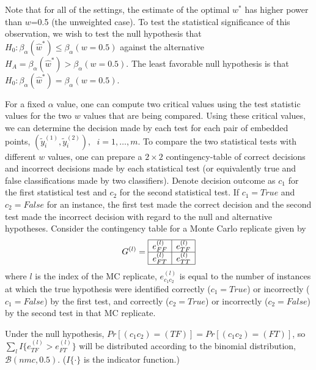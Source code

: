 \documentclass[11pt]{article} %
\begin{document}
Note that  for all of the settings, the estimate of the optimal $w^{*}$ has  higher power than $w$=0.5 (the unweighted case).
To test the statistical significance of this observation, we wish to test the null hypothesis that  $H_{0}: \beta_{\alpha}({\hat{w}^*})\leq\beta_{\alpha}({w=0.5})$ against the alternative $H_{A}=\beta_{\alpha}({\hat{w}^*})>\beta_{\alpha}({w=0.5})$.  The least favorable null hypothesis is that  $H_{0}: \beta_{\alpha}({\hat{w}^*})=\beta_{\alpha}({w=0.5})$.

For a fixed $\alpha$ value, one can compute two critical values  using the test statistic values for the two $w$ values that are being compared. Using these critical  values, we can  determine the decision made by each test for each pair of embedded points, $(\tilde{y}_i^{(1)},\tilde{y}_i^{(2)}),\hspace{7pt}i=1,\ldots,m$. To compare the  two statistical tests with different $w$ values, one can prepare a $2\times 2$ contingency-table of correct decisions and incorrect decisions made by each statistical test (or equivalently true and false classifications made by two classifiers). Denote decision outcome as $c_1$ for the first statistical test and $c_2$ for the second statistical test. If $c_1=True$ and $c_2=False$ for an instance,  the first test made the correct decision and the second test made the incorrect decision with regard to the null and alternative hypotheses.
Consider the contingency table for a Monte Carlo replicate given by $$G^{(l)}= \begin{array}{|c|c|}
      \hline
       e_{FF}^{(l)} & e_{TF}^{(l)}\\
      \hline
       e_{FT}^{(l)} & e_{TT}^{(l)}\\
      \hline
      \end{array}      $$  where $l$ is the index of the MC replicate, $e_{c_1c_2}^{(l)}$ is equal to the number of instances at which the true hypothesis were identified  correctly ($c_1=True$) or incorrectly ($c_1=False$) by the first test, and correctly ($c_2=True$) or incorrectly ($c_2=False$) by the second test in that MC replicate.

Under the null  hypothesis, $Pr[\left(c_1c_2\right)=(TF)]=Pr[\left(c_1c_2\right)=(FT)]$, so $\sum_l{I \{e_{TF}^{(l)}>e_{FT}^{(l)}\}}$ will be distributed according to  the binomial distribution, $\mathcal{B}(nmc,0.5)$. ($I\{\cdot\}$ is the indicator function.) 
\end{document}
